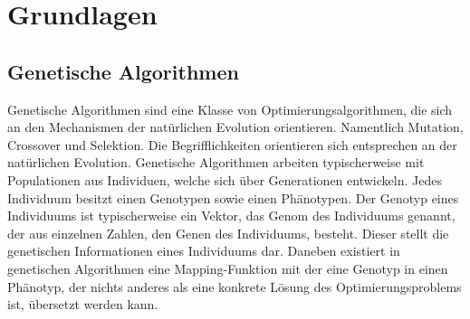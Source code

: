 \section{Grundlagen}

\subsection{Genetische Algorithmen}

Genetische Algorithmen sind eine Klasse von Optimierungsalgorithmen, die sich an den Mechanismen der natürlichen Evolution orientieren.
Namentlich Mutation, Crossover und Selektion.
Die Begrifflichkeiten orientieren sich entsprechen an der natürlichen Evolution.
Genetische Algorithmen arbeiten typischerweise mit Populationen aus Individuen, welche sich über Generationen entwickeln.
Jedes Individuum besitzt einen Genotypen sowie einen Phänotypen.
Der Genotyp eines Individuums ist typischerweise ein Vektor, das Genom des Individuums genannt, der aus einzelnen Zahlen, den Genen des Individuums, besteht. Dieser stellt die genetischen Informationen eines Individuums dar. Daneben existiert in genetischen Algorithmen eine Mapping-Funktion mit der eine Genotyp in einen Phänotyp, der nichts anderes als eine konkrete Lösung des Optimierungsproblems ist, übersetzt werden kann.

